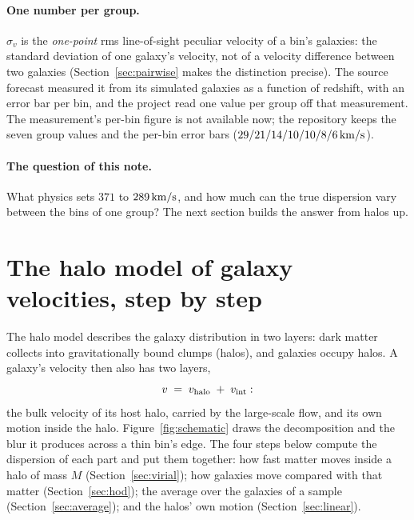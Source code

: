 \documentclass[11pt]{article}
\newcommand{\sv}{\sigma_v}
\newcommand{\kms}{\,{\rm km/s}}
\begin{document}
\paragraph{One number per group.}
$\sv$ is the \emph{one-point} rms line-of-sight peculiar velocity of a
bin's galaxies: the standard deviation of one galaxy's velocity, not of
a velocity difference between two galaxies
(Section~\ref{sec:pairwise} makes the distinction precise).  The source
forecast measured it from its simulated galaxies as a function of
redshift, with an error bar per bin, and the project read one value per
group off that measurement.  The measurement's per-bin figure is not
available now; the repository keeps the seven group values and the
per-bin error bars ($29/21/14/10/10/8/6\kms$).

\paragraph{The question of this note.}
What physics sets $371$ to $289\kms$, and how much can the true
dispersion vary between the bins of one group?  The next section
builds the answer from halos up.

\section{The halo model of galaxy velocities, step by step}
\label{sec:halomodel}

The halo model describes the galaxy distribution in two layers: dark
matter collects into gravitationally bound clumps (halos), and galaxies
occupy halos.  A galaxy's velocity then also has two layers,
\begin{equation}
  v \;=\; v_{\rm halo} \;+\; v_{\rm int} :
  \label{eq:twoparts}
\end{equation}
the bulk velocity of its host halo, carried by the large-scale flow,
and its own motion inside the halo.  Figure~\ref{fig:schematic} draws
the decomposition and the blur it produces across a thin bin's edge.
The four steps below compute the
dispersion of each part and put them together: how fast matter moves
inside a halo of mass $M$ (Section~\ref{sec:virial}); how galaxies
move compared with that matter (Section~\ref{sec:hod}); the average
over the galaxies of a sample (Section~\ref{sec:average}); and the
halos' own motion (Section~\ref{sec:linear}).
\end{document}
